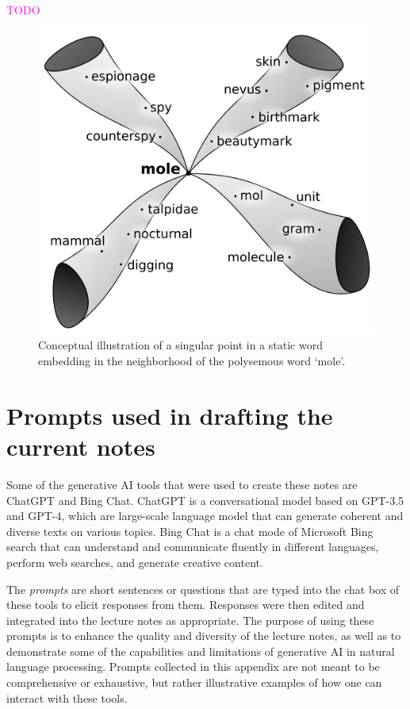 \documentclass[11pt, a4paper]{amsart}
\begin{document}
\textcolor{magenta}{TODO}

\begin{figure}
	\centering
	\includegraphics[width=0.35\linewidth]{figures/topological_data_analysis/TPS_paper_screenshot}
	\caption{
		Conceptual illustration of a singular point in a static word embedding in the neighborhood of the polysemous word `mole'.
		\label{fig:TPS_paper_screenshot}
	}
\end{figure}


\newpage
\printbibliography


\newpage
\appendix


\section{Prompts used in drafting the current notes}
\label{appendix:prompts}

Some of the generative AI tools that were used to create these notes are ChatGPT and Bing Chat.
ChatGPT is a conversational model based on GPT-3.5 and GPT-4, which are large-scale language model that can generate coherent and diverse texts on various topics.
Bing Chat is a chat mode of Microsoft Bing search that can understand and communicate fluently in different languages, perform web searches, and generate creative content.

The \emph{prompts} are short sentences or questions that are typed into the chat box of these tools to elicit responses from them. 
Responses were then edited and integrated into the lecture notes as appropriate. 
The purpose of using these prompts is to enhance the quality and diversity of the lecture notes, as well as to demonstrate some of the capabilities and limitations of generative AI in natural language processing.
Prompts collected in this appendix are not meant to be comprehensive or exhaustive, but rather illustrative examples of how one can interact with these tools.
\end{document}
